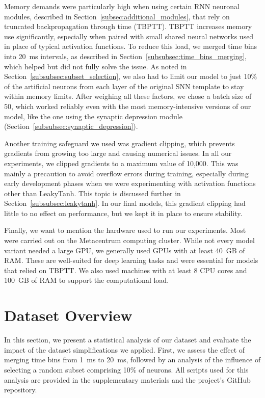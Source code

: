Memory demands were particularly high when using certain RNN neuronal modules, described in Section~\ref{subsec:additional_modules}, that rely on truncated backpropagation through time (TBPTT). TBPTT increases memory use significantly, especially when paired with small shared neural networks used in place of typical activation functions. To reduce this load, we merged time bins into 20~ms intervals, as described in Section~\ref{subsubsec:time_bins_merging}, which helped but did not fully solve the issue. As noted in Section~\ref{subsubsec:subset_selection}, we also had to limit our model to just 10\% of the artificial neurons from each layer of the original SNN template to stay within memory limits. After weighing all these factors, we chose a batch size of $50$, which worked reliably even with the most memory-intensive versions of our model, like the one using the synaptic depression module (Section~\ref{subsubsec:synaptic_depression}).

Another training safeguard we used was gradient clipping, which prevents gradients from growing too large and causing numerical issues. In all our experiments, we clipped gradients to a maximum value of 10,000. This was mainly a precaution to avoid overflow errors during training, especially during early development phases when we were experimenting with activation functions other than LeakyTanh. This topic is discussed further in Section~\ref{subsubsec:leakytanh}. In our final models, this gradient clipping had little to no effect on performance, but we kept it in place to ensure stability.

Finally, we want to mention the hardware used to run our experiments. Most were carried out on the Metacentrum computing cluster. While not every model variant needed a large GPU, we generally used GPUs with at least 40~GB of RAM. These are well-suited for deep learning tasks and were essential for models that relied on TBPTT. We also used machines with at least 8 CPU cores and 100~GB of RAM to support the computational load.


\section{Dataset Overview}
\label{sec:dataset_overview}

In this section, we present a statistical analysis of our dataset and evaluate the impact of the dataset simplifications we applied. First, we assess the effect of merging time bins from 1~ms to 20~ms, followed by an analysis of the influence of selecting a random subset comprising 10\% of neurons. All scripts used for this analysis are provided in the supplementary materials and the project's GitHub repository.

